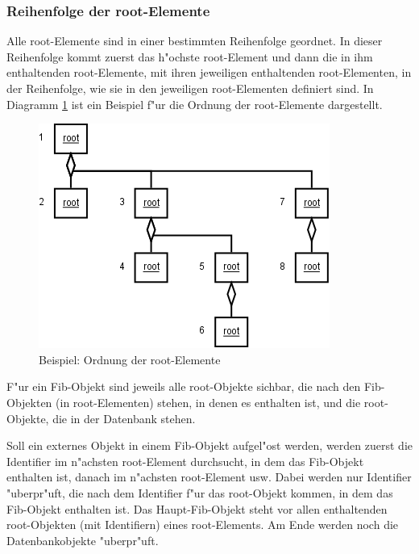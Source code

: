 \subsubsection{Reihenfolge der root-Elemente}
\label{secRootOrder}

Alle root-Elemente sind in einer bestimmten Reihenfolge geordnet. In dieser Reihenfolge kommt zuerst das h"ochste root-Element und dann die in ihm enthaltenden root-Elemente, mit ihren jeweiligen enthaltenden root-Elementen, in der Reihenfolge, wie sie in den jeweiligen root-Elementen definiert sind. In Diagramm \ref{figOrderRoot} ist ein Beispiel f"ur die Ordnung der root-Elemente dargestellt.

\begin{figure}[htbp]
\begin{center}
  \includegraphics[scale=0.4]{order_root}
\end{center}
\caption{Beispiel: Ordnung der root-Elemente}
\label{figOrderRoot}
\end{figure}

F"ur ein Fib-Objekt sind jeweils alle root-Objekte sichbar, die nach den Fib-Objekten (in root-Elementen) stehen, in denen es enthalten ist, und die root-Objekte, die in der Datenbank stehen.

Soll ein externes Objekt  in einem Fib-Objekt aufgel"ost werden, werden zuerst die Identifier im n"achsten root-Element durchsucht, in dem das Fib-Objekt enthalten ist, danach im n"achsten root-Element usw. Dabei werden nur Identifier "uberpr"uft, die nach dem Identifier f"ur das root-Objekt kommen, in dem das Fib-Objekt enthalten ist. Das Haupt-Fib-Objekt steht vor allen enthaltenden root-Objekten (mit Identifiern) eines root-Elements. Am Ende werden noch die Datenbankobjekte "uberpr"uft.

